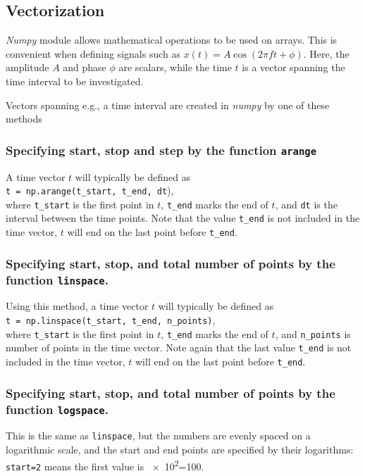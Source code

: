 \subsection{Vectorization}
\emph{Numpy} module allows mathematical operations to be used on arrays. This is convenient when defining signals such as $x(t)=A \cos(2\pi f t + \phi)$. Here, the amplitude $A$ and phase $\phi$ are scalars, while the time $t$ is a vector spanning the time interval to be investigated. 

Vectors spanning e.g., a time interval are created in \emph{numpy} by one of these methods

\subsubsection*{Specifying start, stop and step by the function \texttt{arange}} 
A time vector $t$ will typically be defined as\\
\verb|t = np.arange(t_start, t_end, dt|), \\
where \verb|t_start| is the first point in $t$, \verb|t_end| marks the end of $t$, and \verb|dt| is the interval between the time points. Note that the value \verb|t_end| is not included in the time vector, $t$ will end on the last point before \verb|t_end|.
	
\subsubsection*{Specifying start, stop, and total number of points by the function \texttt{linspace}. }
Using this method, a time vector $t$ will typically be defined as \\
\verb|t = np.linspace(t_start, t_end, n_points)|, \\
where \verb|t_start| is the first point in $t$, \verb|t_end| marks the end of $t$, and \verb|n_points| is number of points in the time vector. Note again that the last value \verb|t_end| is not included in the time vector, $t$ will end on the last point before \verb|t_end|.
	
\subsubsection*{Specifying start, stop, and total number of points by the function \texttt{logspace}.} 
	
This is the same as \verb|linspace|, but the numbers are evenly spaced on a logarithmic scale, and the start and end points are specified by their logarithms: \verb|start=2| means the first value is \num{e2}=\num{100}.


